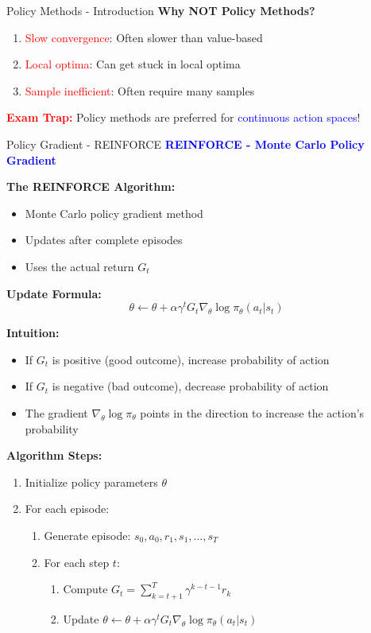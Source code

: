 \documentclass[8pt]{beamer}
\begin{document}
\begin{frame}{Policy Methods - Introduction}
		\textbf{Why NOT Policy Methods?}
		\begin{enumerate}
			\item \textcolor{red}{Slow convergence}: Often slower than value-based
			\item \textcolor{red}{Local optima}: Can get stuck in local optima
			\item \textcolor{red}{Sample inefficient}: Often require many samples
		\end{enumerate}
		
		\textcolor{red}{\textbf{Exam Trap:}} Policy methods are preferred for \textcolor{blue}{continuous action spaces}!
	\end{frame}
	
	\begin{frame}{Policy Gradient - REINFORCE}
		\fontsize{6.5}{7.5}\selectfont
		\textcolor{blue}{\textbf{REINFORCE - Monte Carlo Policy Gradient}}
		
		\textbf{The REINFORCE Algorithm:}
		\begin{itemize}
			\item Monte Carlo policy gradient method
			\item Updates after complete episodes
			\item Uses the actual return $G_t$
		\end{itemize}
		
		\textbf{Update Formula:}
		\[
		\theta \leftarrow \theta + \alpha \gamma^t G_t \nabla_\theta \log \pi_\theta(a_t|s_t)
		\]
		
		\textbf{Intuition:}
		\begin{itemize}
			\item If $G_t$ is positive (good outcome), increase probability of action
			\item If $G_t$ is negative (bad outcome), decrease probability of action
			\item The gradient $\nabla_\theta \log \pi_\theta$ points in the direction to increase the action's probability
		\end{itemize}
		
		\textbf{Algorithm Steps:}
		\begin{enumerate}
			\item Initialize policy parameters $\theta$
			\item For each episode:
			\begin{enumerate}
				\item Generate episode: $s_0, a_0, r_1, s_1, ..., s_T$
				\item For each step $t$:
				\begin{enumerate}
					\item Compute $G_t = \sum_{k=t+1}^T \gamma^{k-t-1} r_k$
					\item Update $\theta \leftarrow \theta + \alpha \gamma^t G_t \nabla_\theta \log \pi_\theta(a_t|s_t)$
				\end{enumerate}
			\end{enumerate}
		\end{enumerate}
		

\end{frame}
\end{document}
